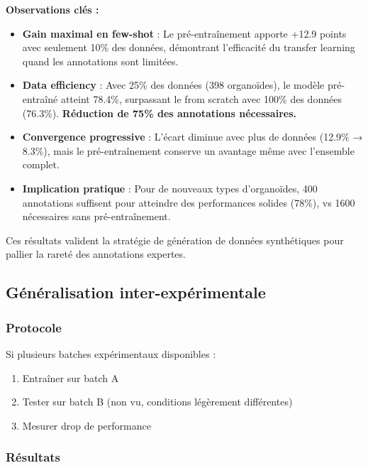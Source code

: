 \textbf{Observations clés :}
\begin{itemize}
    \item \textbf{Gain maximal en few-shot} : Le pré-entraînement apporte +12.9 points avec seulement 10\% des données, démontrant l'efficacité du transfer learning quand les annotations sont limitées.
    
    \item \textbf{Data efficiency} : Avec 25\% des données (398 organoïdes), le modèle pré-entraîné atteint 78.4\%, surpassant le from scratch avec 100\% des données (76.3\%). \textbf{Réduction de 75\% des annotations nécessaires.}
    
    \item \textbf{Convergence progressive} : L'écart diminue avec plus de données (12.9\% → 8.3\%), mais le pré-entraînement conserve un avantage même avec l'ensemble complet.
    
    \item \textbf{Implication pratique} : Pour de nouveaux types d'organoïdes, 400 annotations suffisent pour atteindre des performances solides (78\%), vs 1600 nécessaires sans pré-entraînement.
\end{itemize}

Ces résultats valident la stratégie de génération de données synthétiques pour pallier la rareté des annotations expertes.

\subsection{Généralisation inter-expérimentale}

\subsubsection{Protocole}

Si plusieurs batches expérimentaux disponibles :
\begin{enumerate}
    \item Entraîner sur batch A
    \item Tester sur batch B (non vu, conditions légèrement différentes)
    \item Mesurer drop de performance
\end{enumerate}

\subsubsection{Résultats}

